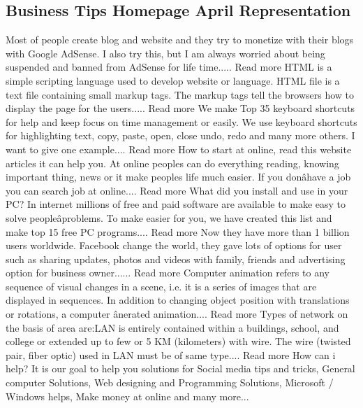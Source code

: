 \documentclass[a4paper,12pt]{article}
\begin{document}
\begin{appendices}
\subsection{Business Tips Homepage April Representation}
Most of people create blog and website and they try to monetize with their blogs with Google AdSense. I also try this, but I am always worried about being suspended and banned from AdSense for life time..... Read more
HTML is a simple scripting language used to develop website or language. HTML file is a text file containing small markup tags. The markup tags tell the browsers how to display the page for the users..... Read more
We make Top 35 keyboard shortcuts for help and keep focus on time management or easily. We use keyboard shortcuts for highlighting text, copy, paste, open, close undo, redo and many more others. I want to give one example.... Read more
How to start at online, read this website articles it can help you. At online peoples can do everything reading, knowing important thing, news or it make peoples life much easier. If you donâhave a job you can search job at online.... Read more
What did you install and use in your PC? In internet millions of free and paid software are available to make easy to solve peopleâproblems. To make easier for you, we have created this list and make top 15 free PC programs.... Read more
Now they have more than 1 billion users worldwide. Facebook change the world, they gave lots of options for user such as sharing updates, photos and videos with family, friends and advertising option for business owner...... Read more
Computer animation refers to any sequence of visual changes in a scene, i.e. it is a series of images that are displayed in sequences. In addition to changing object position with translations or rotations, a computer ânerated animation.... Read more
Types of network on the basis of area are:LAN is entirely contained within a buildings, school, and college or extended up to few or 5 KM (kilometers) with wire. The wire (twisted pair, fiber optic) used in LAN must be of same type.... Read more
How can i help?
It is our goal to help you solutions for Social media tips and tricks, General computer Solutions, Web designing and Programming Solutions, Microsoft / Windows helps, Make money at online and many more...

\end{appendices}
\end{document}
